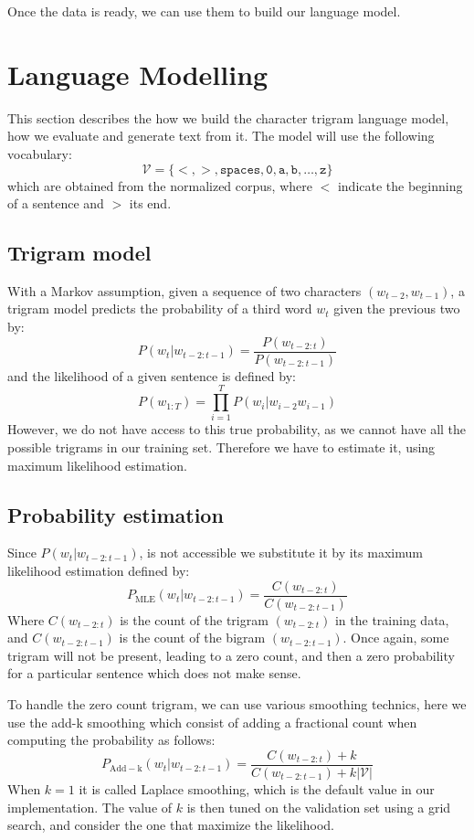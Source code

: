 Once the data is ready, we can use them to build our language model.
\section{Language Modelling}
This section describes the how we build the character trigram language model, how we evaluate and generate text from it. The model will use the following vocabulary:
\begin{equation}
    \mathcal{V} = \{ \mathtt{<, >, spaces, 0, a, b, \ldots, z} \}
\end{equation}
which are obtained from the normalized corpus, where $<$ indicate the beginning of  a sentence and $>$ its end.
\subsection{Trigram model}
With a Markov assumption, given a sequence of two characters $(w_{t-2}, w_{t-1})$, a trigram model predicts the probability of a third word $w_t$ given the previous two by:
\begin{equation}
    P(w_t|w_{t-2:t-1}) = \frac{P(w_{t-2:t})}{P(w_{t-2:t-1})}
\end{equation}
and the likelihood of a given sentence  is defined by:
\begin{equation}
    P(w_{1:T})=\prod_{i=1}^{T}P(w_i|w_{i-2}w_{i-1})
\end{equation}
However, we do not have access to this true probability, as we cannot have all the possible trigrams in our training set. Therefore we have to estimate it, using maximum likelihood estimation.
\subsection{Probability estimation}
Since $P(w_t|w_{t-2:t-1})$, is not accessible we substitute it by its maximum likelihood estimation defined by:
\begin{equation}
    P_{\mathrm{MLE}}(w_t|w_{t-2:t-1}) = \frac{C(w_{t-2:t})}{C(w_{t-2:t-1})}
\end{equation}
Where $C(w_{t-2:t})$ is the count of the trigram $(w_{t-2:t})$ in the training data, and $C(w_{t-2:t-1})$ is the count of the bigram $(w_{t-2:t-1})$. Once again, some trigram will not be present, leading to a zero count, and then a zero probability for a particular sentence which does not make sense. 

To handle the zero count trigram, we can use various smoothing technics, here we use the add-k smoothing which consist of adding a fractional count when computing the probability as follows:
    \begin{equation}
        P_{\mathrm{Add-k}}(w_t|w_{t-2:t-1}) = \frac{C(w_{t-2:t})+k}{C(w_{t-2:t-1})+k|\mathcal{V}|}
    \end{equation}
When $k=1$ it is called Laplace smoothing, which is the default value in our implementation. The value of $k$ is then tuned on the validation set using a grid search, and consider the one that maximize the likelihood. 

